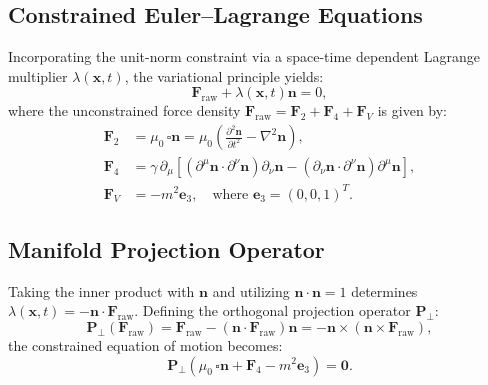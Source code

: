 \documentclass[11pt,a4paper]{article}
\begin{document}
	\subsection{Constrained Euler--Lagrange Equations}
	Incorporating the unit-norm constraint via a space-time dependent Lagrange multiplier $\lambda(\mathbf{x}, t)$, the variational principle yields:
	\begin{equation}
		\mathbf{F}_{\text{raw}} + \lambda(\mathbf{x}, t) \mathbf{n} = 0,
	\end{equation}
	where the unconstrained force density $\mathbf{F}_{\text{raw}} = \mathbf{F}_2 + \mathbf{F}_4 + \mathbf{F}_V$ is given by:
	\begin{align}
		\mathbf{F}_2 &= \mu_0 \, \square \mathbf{n} = \mu_0 \left( \frac{\partial^2 \mathbf{n}}{\partial t^2} - \nabla^2 \mathbf{n} \right), \label{eq:F2_operator} \\
		\mathbf{F}_4 &= \gamma \, \partial_\mu \left[ \left( \partial^\mu \mathbf{n} \cdot \partial^\nu \mathbf{n} \right) \partial_\nu \mathbf{n} - \left( \partial_\nu \mathbf{n} \cdot \partial^\nu \mathbf{n} \right) \partial^\mu \mathbf{n} \right], \label{eq:F4_operator} \\
		\mathbf{F}_V &= -m^2 \mathbf{e}_3, \quad \text{where } \mathbf{e}_3 = (0, 0, 1)^T. \label{eq:FV_operator}
	\end{align}
	
	\subsection{Manifold Projection Operator}
	Taking the inner product with $\mathbf{n}$ and utilizing $\mathbf{n} \cdot \mathbf{n} = 1$ determines $\lambda(\mathbf{x}, t) = -\mathbf{n} \cdot \mathbf{F}_{\text{raw}}$. Defining the orthogonal projection operator $\mathbf{P}_\perp$:
	\begin{equation}
		\mathbf{P}_\perp(\mathbf{F}_{\text{raw}}) = \mathbf{F}_{\text{raw}} - (\mathbf{n} \cdot \mathbf{F}_{\text{raw}}) \mathbf{n} = -\mathbf{n} \times (\mathbf{n} \times \mathbf{F}_{\text{raw}}),
		\label{eq:projection_operator}
	\end{equation}
	the constrained equation of motion becomes:
	\begin{equation}
		\mathbf{P}_\perp \left( \mu_0 \, \square \mathbf{n} + \mathbf{F}_4 - m^2 \mathbf{e}_3 \right) = \mathbf{0}.
		\label{eq:eom_final}
	\end{equation}
	
\end{document}
